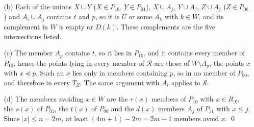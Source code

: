 \documentclass[12pt]{article}
\theoremstyle{plain}
\begin{document}
(b) Each of the unions $X\cup Y$ ($X\in P_{10}$, $Y\in P_{01}$), $X\cup A_j$, $Y\cup A_j$, $Z\cup A_j$ ($Z\in P_{00}$) and $A_i\cup A_j$ contains $t$ and $p$, so it is $U$ or some $A_k$ with $k\in W$, and its complement in $W$ is empty or $D(k)$. These complements are the five intersections listed.

(c) The member $A_p$ contains $t$, so it lies in $P_{10}$, and it contains every member of $P_{10}$; hence the points lying in every member of $\mathcal R$ are those of $W\setminus A_p$, the points $x$ with $x\preceq p$. Such an $x$ lies only in members containing $p$, so in no member of $P_{00}$, and therefore in every $T_Z$. The same argument with $A_t$ applies to $\mathcal S$.

(d) The members avoiding $x\in W$ are the $r(x)$ members of $P_{10}$ with $x\in R_X$, the $s(x)$ of $P_{01}$, the $t(x)$ of $P_{00}$ and the $d(x)$ members $A_j$ of $P_{11}$ with $x\le j$. Since $|x|\le n=2m$, at least $(4m+1)-2m=2m+1$ members avoid $x$. \qed
\end{document}
